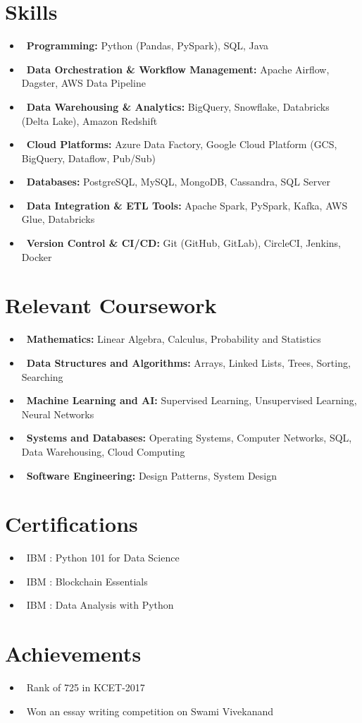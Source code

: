 \documentclass[letterpaper,10.99pt]{article}
\newcommand{\resumeItem}[1]{\item\small{#1}}
\newcommand{\resumeSubHeadingList}{\begin{itemize}[leftmargin=0.10in, label={}]}
\newcommand{\resumeSubHeadingListEnd}{\end{itemize}}
\begin{document}
\hfill
\begin{minipage}[t]{0.33\textwidth}




\section{Skills}
\resumeSubHeadingList

\resumeItem{\textbullet\ \textbf{Programming:} Python (Pandas, PySpark), SQL, Java}
\resumeItem{\textbullet\ \textbf{Data Orchestration & Workflow Management:} Apache Airflow, Dagster, AWS Data Pipeline}
\resumeItem{\textbullet\ \textbf{Data Warehousing & Analytics:} BigQuery, Snowflake, Databricks (Delta Lake), Amazon Redshift}
\resumeItem{\textbullet\ \textbf{Cloud Platforms:} Azure Data Factory, Google Cloud Platform (GCS, BigQuery, Dataflow, Pub/Sub)}
\resumeItem{\textbullet\ \textbf{Databases:} PostgreSQL, MySQL, MongoDB, Cassandra, SQL Server}
\resumeItem{\textbullet\ \textbf{Data Integration & ETL Tools:} Apache Spark, PySpark, Kafka, AWS Glue, Databricks}
\resumeItem{\textbullet\ \textbf{Version Control & CI/CD:} Git (GitHub, GitLab), CircleCI, Jenkins, Docker}
\resumeSubHeadingListEnd
\sectionsep


\section{Relevant Coursework}
\resumeSubHeadingList
\resumeItem{\textbullet\ \textbf{Mathematics:} Linear Algebra, Calculus, Probability and Statistics}
\resumeItem{\textbullet\ \textbf{Data Structures and Algorithms:} Arrays, Linked Lists, Trees, Sorting, Searching}
\resumeItem{\textbullet\ \textbf{Machine Learning and AI:} Supervised Learning, Unsupervised Learning, Neural Networks}
\resumeItem{\textbullet\ \textbf{Systems and Databases:} Operating Systems, Computer Networks, SQL, Data Warehousing, Cloud Computing}
\resumeItem{\textbullet\ \textbf{Software Engineering:} Design Patterns, System Design}
\resumeSubHeadingListEnd
\sectionsep
    

\section{Certifications}
\resumeSubHeadingList
\resumeItem{\textbullet\ IBM : Python 101 for Data Science}
\resumeItem{\textbullet\ IBM : Blockchain Essentials}
\resumeItem{\textbullet\ IBM : Data Analysis with Python}
\resumeSubHeadingListEnd

\section{Achievements}
\resumeSubHeadingList
\resumeItem{\textbullet\ Rank of 725 in KCET-2017}
\resumeItem{\textbullet\ Won an essay writing competition on Swami Vivekanand}
\resumeSubHeadingListEnd

\end{minipage}
\end{document}
